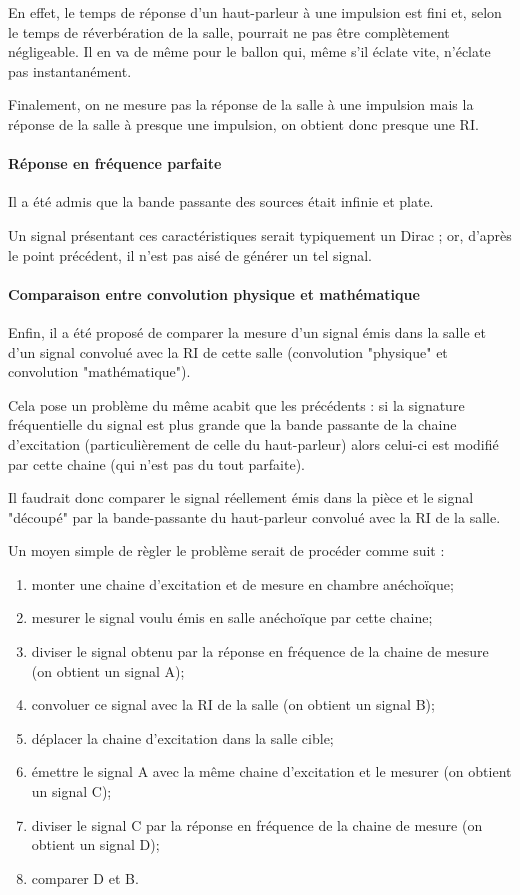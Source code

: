 \documentclass[12pt]{article}
\begin{document}
En effet, le temps de réponse d'un haut-parleur à une impulsion est fini et, selon le temps de réverbération de la
salle, pourrait ne pas être complètement négligeable. Il en va de même pour le ballon qui, même s'il éclate vite,
n'éclate pas instantanément.

Finalement, on ne mesure pas la réponse de la salle à une impulsion mais la réponse de la salle à presque une impulsion,
on obtient donc presque une RI.

\paragraph{Réponse en fréquence parfaite} %

Il a été admis que la bande passante des sources était infinie et plate.

Un signal présentant ces caractéristiques serait typiquement un Dirac ; or, d'après le point précédent, il n'est pas
aisé de générer un tel signal.

\paragraph{Comparaison entre convolution physique et mathématique} %

Enfin, il a été proposé de comparer la mesure d'un signal émis dans la salle et d'un signal convolué avec la RI de cette
salle (convolution "physique" et convolution "mathématique").

Cela pose un problème du même acabit que les précédents : si la signature fréquentielle du signal est plus grande que la
bande passante de la chaine d'excitation (particulièrement de celle du haut-parleur) alors celui-ci est modifié par
cette chaine (qui n'est pas du tout parfaite).

Il faudrait donc comparer le signal réellement émis dans la pièce et le signal "découpé" par la bande-passante du
haut-parleur convolué avec la RI de la salle.

Un moyen simple de règler le problème serait de procéder comme suit :

\begin{enumerate}
    \item monter une chaine d'excitation et de mesure en chambre anéchoïque;
    \item mesurer le signal voulu émis en salle anéchoïque par cette chaine;
    \item diviser le signal obtenu par la réponse en fréquence de la chaine de mesure (on obtient un signal A);
    \item convoluer ce signal avec la RI de la salle (on obtient un signal B);
    \item déplacer la chaine d'excitation dans la salle cible;
    \item émettre le signal A avec la même chaine d'excitation et le mesurer (on obtient un signal C);
    \item diviser le signal C par la réponse en fréquence de la chaine de mesure (on obtient un signal D);
    \item comparer D et B.
\end{enumerate}
\end{document}
